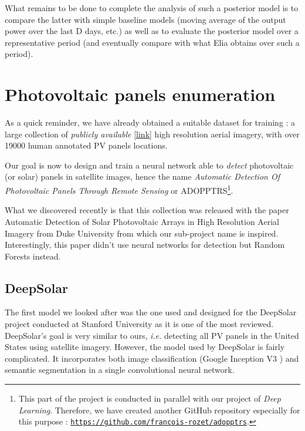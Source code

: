 \documentclass[a4paper, 12pt]{article}
\begin{document}
	What remains to be done to complete the analysis of such a posterior model is to compare the latter with simple baseline models (moving average of the output power over the last D days, etc.) as well as to evaluate the posterior model over a representative period (and eventually compare with what Elia obtains over such a period).

    \newpage
    
    \section{Photovoltaic panels enumeration}
    
    As a quick reminder, we have already obtained a suitable dataset for training : a large collection of \emph{publicly available} [\href{https://energy.duke.edu/content/distributed-solar-pv-array-location-and-extent-data-set-remote-sensing-object-identification}{link}] high resolution aerial imagery, with over \num{19000} human annotated PV panels locations.
    
    Our goal is now to design and train a neural network able to \emph{detect} photovoltaic (or solar) panels in satellite images, hence the name \emph{Automatic Detection Of Photovoltaic Panels Through Remote Sensing} or ADOPPTRS\footnote{This part of the project is conducted in parallel with our project of \emph{Deep Learning}. Therefore, we have created another GitHub repository especially for this purpose : \texttt{\href{https://github.com/francois-rozet/adopptrs}{https://github.com/francois-rozet/adopptrs}}.}.
    
    \begin{note}
        What we discovered recently is that this collection was released with the paper \og{}Automatic Detection of Solar Photovoltaic Arrays in High Resolution Aerial Imagery\fg{} \cite{malof2016automatic} from Duke University from which our sub-project name is inspired. Interestingly, this paper didn't use neural networks for detection but Random Forests instead.
    \end{note}
    
    \subsection{DeepSolar}
    
    The first model we looked after was the one used and designed for the DeepSolar \cite{yu2018deepsolar} project conducted at Stanford University as it is one of the most reviewed. DeepSolar's goal is very similar to ours, \emph{i.e.} detecting all PV panels in the United States using satellite imagery. However, the model used by DeepSolar is fairly complicated. It incorporates both image classification (Google Inception V3 \cite{szegedy2016rethinking}) and semantic segmentation in a single convolutional neural network.
    
\end{document}
